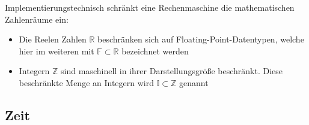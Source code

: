 Implementierungstechnisch schränkt eine Rechenmaschine die mathematischen Zahlenräume ein:
\begin{itemize}
\item Die Reelen Zahlen $\mathbb{R}$ beschränken sich auf Floating-Point-Datentypen, welche hier im weiteren mit $\mathbb{F} \subset \mathbb{R}$ bezeichnet werden
\item Integern $\mathbb{Z}$ sind maschinell in ihrer Darstellungsgröße beschränkt. Diese beschränkte Menge an Integern wird $\mathbb{I} \subset \mathbb{Z}$ genannt
\end{itemize}


\subsection{Zeit}
\label{sec:time}
\def\finite#1{\ooalign{\hfil$\mapstochar\mkern 3mu\mapstochar\mkern 5mu$\hfil\cr$#1$}}

